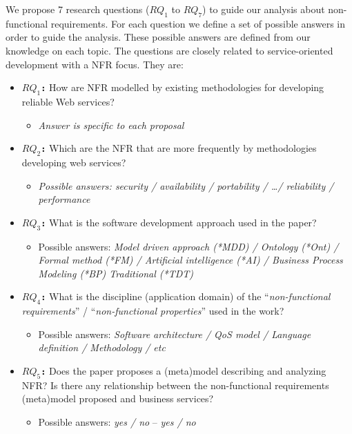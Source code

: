 \documentclass{sig-alternate}
\begin{document}
We propose 7 research questions ($RQ_1$ to $RQ_7$) to guide our analysis about non-functional
requirements. 
For each question we define a set of possible answers in order to guide
the analysis.
These possible answers are defined from our knowledge on each topic. 
The questions are closely related to service-oriented development with a NFR focus.
They are:
\begin{itemize} 
  \item \textbf{\texttt{$RQ_1$:}} How are NFR modelled by existing
  methodologies for developing reliable Web services?
  \begin{itemize}
	  \item \textit{Answer is specific to each proposal}
	\end{itemize}  
 \item \textbf{\texttt{$RQ_2$:}} Which are the NFR that are more frequently
 by methodologies developing web services?
 	\begin{itemize}
	  \item \textit{Possible answers: security / availability / portability / \ldots / reliability /
	  performance}
	\end{itemize}
  \item \textbf{\texttt{$RQ_3$:}} What is the software
  development approach used in the paper?
	\begin{itemize}
	  \item Possible answers: \textit{Model driven approach (*MDD) / Ontology (*Ont) / Formal method
	  (*FM) / Artificial intelligence (*AI) / Business Process Modeling (*BP)
	  Traditional (*TDT)}
	\end{itemize} 
  \item \textbf{\texttt{$RQ_4$:}} What is the discipline (application domain)
  of the ``\textit{non-functional requirements}'' / ``\textit{non-functional
  properties}'' used in the work?
  \begin{itemize}
	  \item Possible answers: \textit{Software architecture / QoS model / Language definition /
	  Methodology / etc}
	\end{itemize}	
  \item \textbf{\texttt{$RQ_5$:}} Does the paper proposes a (meta)model
  describing and analyzing NFR? Is there any relationship between
  the non-functional requirements (meta)model proposed and business services? 
\begin{itemize}
	  \item Possible answers: \textit{yes / no} -- \textit{yes / no}

\end{itemize}
\end{itemize}
\end{document}

